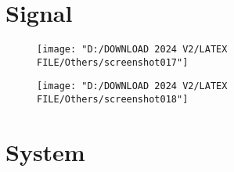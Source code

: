 \documentclass[a4paper,12pt]{article}
\begin{document}
	\section{Signal}
	
	\begin{figure}[H]
		\centering
		\texttt{[image: "D:/DOWNLOAD 2024 V2/LATEX FILE/Others/screenshot017"]}
		\caption{}
		\label{fig:screenshot017}
	\end{figure}
	\begin{figure}[H]
		\centering
		\texttt{[image: "D:/DOWNLOAD 2024 V2/LATEX FILE/Others/screenshot018"]}
		\caption{}
		\label{fig:screenshot018}
	\end{figure}
	
	\section{System}
\end{document}
